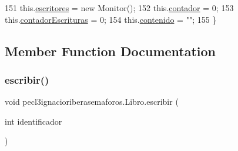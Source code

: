\begin{DoxyCode}
151         this.\mbox{\hyperlink{classpecl3ignacioriberasemaforos_1_1_libro_a54d314cadff093d0ca9a579fdbc049fe}{escritores}} = \textcolor{keyword}{new} Monitor();
152         this.\mbox{\hyperlink{classpecl3ignacioriberasemaforos_1_1_libro_a3e40890fd6a99fd333cc76188bf0841b}{contador}} = 0;
153         this.\mbox{\hyperlink{classpecl3ignacioriberasemaforos_1_1_libro_a94d54e5e2f7b6bb396e9eaa6799fdbe9}{contadorEscrituras}} = 0;
154         this.\mbox{\hyperlink{classpecl3ignacioriberasemaforos_1_1_libro_ab2fc8d572a85bf24b8c3558b7739d8a8}{contenido}} = \textcolor{stringliteral}{""};
155     \}
\end{DoxyCode}


\subsection{Member Function Documentation}
\mbox{\label{classpecl3ignacioriberasemaforos_1_1_libro_a8077242f921bac18bb1205ae15356d95}} 
\subsubsection{\texorpdfstring{escribir()}{escribir()}}
{\footnotesize\ttfamily void pecl3ignacioriberasemaforos.\+Libro.\+escribir (\begin{DoxyParamCaption}\item[{int}]{identificador }\end{DoxyParamCaption})\hspace{0.3cm}{\ttfamily [inline]}}


